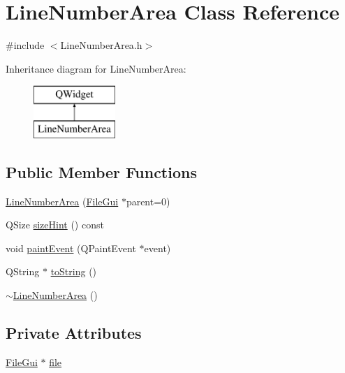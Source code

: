 \hypertarget{class_line_number_area}{\section{Line\-Number\-Area Class Reference}
\label{class_line_number_area}
}


{\ttfamily \#include $<$Line\-Number\-Area.\-h$>$}

Inheritance diagram for Line\-Number\-Area\-:\begin{figure}[H]
\begin{center}
\leavevmode
\includegraphics[height=2.000000cm]{class_line_number_area}
\end{center}
\end{figure}
\subsection*{Public Member Functions}
\begin{DoxyCompactItemize}
\item 
\hyperlink{class_line_number_area_a7bc91f89287a239f287915c96537a5fc}{Line\-Number\-Area} (\hyperlink{class_file_gui}{File\-Gui} $\ast$parent=0)
\item 
Q\-Size \hyperlink{class_line_number_area_a5d31f7fb107bc1eefd7ae4974c095308}{size\-Hint} () const 
\item 
void \hyperlink{class_line_number_area_a56400934bfe272427deb3ffd975b3a7f}{paint\-Event} (Q\-Paint\-Event $\ast$event)
\item 
Q\-String $\ast$ \hyperlink{class_line_number_area_a766399c5d0e01c14da97bd79b5eab89f}{to\-String} ()
\item 
\hyperlink{class_line_number_area_abccdc5ad204da18e0fedee62ad4a58ce}{$\sim$\-Line\-Number\-Area} ()
\end{DoxyCompactItemize}
\subsection*{Private Attributes}
\begin{DoxyCompactItemize}
\item 
\hyperlink{class_file_gui}{File\-Gui} $\ast$ \hyperlink{class_line_number_area_a08ebbed0dba5e4740c0af7d006614922}{file}
\end{DoxyCompactItemize}


